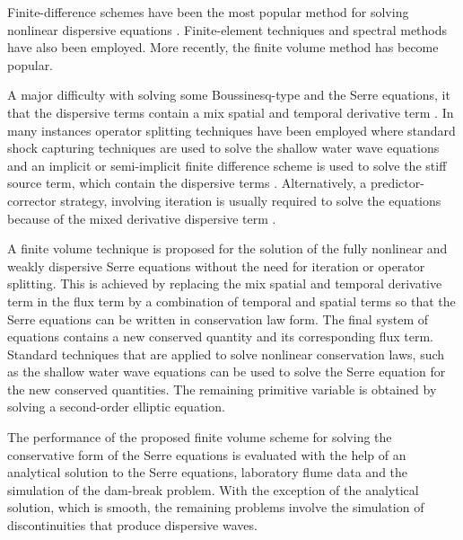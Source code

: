 \documentclass[SingleSpace,12pt]{Serre_ASCE}
\begin{document}
Finite-difference schemes have been the most popular method for solving nonlinear dispersive equations \cite{Antunes-do-Carmo-etal-1993-725,Nwogu-O-1993-618,El-etal-2008-2423,Beji-Nadaoka-1996}. Finite-element techniques \cite{Avilez-Valente-Seabra-Santos-2009-969,Mitsotakis-D-2009-860} and spectral methods \cite{Dias-Milewski-2010,Eskilsson-Sherwin-2002-143} have also been employed. More recently, the finite volume method \cite{Shiach-Mingham-2009-32,Erduran-etal-2005-1213,Erduran-K-2007-827,Soares-Frazao-Guinot-2008-237,Tonelli-Petti-2012-8,Roeber-etal-2010-407,Tonelli-Petti-2009-609} has become popular.

A major difficulty with solving some Boussinesq-type and the Serre equations, it that the dispersive terms  contain a mix spatial and temporal derivative term \cite{Dias-Milewski-2010}. In many instances operator splitting techniques have been employed where standard shock capturing techniques are used to solve the shallow water wave equations and an implicit or semi-implicit finite difference scheme is used to solve the stiff source term, which contain the dispersive terms \cite{Shiach-Mingham-2009-32,Bonneton-etal-2011-589,Erduran-K-2007-827,Soares-Frazao-Guinot-2008-237,Tonelli-Petti-2009-609,Chazel-etal-2011-105}. Alternatively, a predictor-corrector strategy, involving iteration is usually required to solve the equations because of the mixed derivative dispersive term \cite{Beji-Nadaoka-1996,Erduran-K-2007-827,Roeber-etal-2010-407,Shi-etal-2012-36}.

A finite volume technique is proposed for the solution of the fully nonlinear and weakly dispersive Serre equations without the need for iteration or operator splitting. This is achieved by replacing the mix spatial and temporal derivative term in the flux term by a combination of temporal and spatial terms so that the Serre equations can be written in conservation law form. The final system of equations contains a new conserved quantity and its corresponding flux term. Standard techniques that are applied to solve nonlinear conservation laws, such as the shallow water wave equations can be used to solve the Serre equation for the new conserved quantities. The remaining primitive variable is obtained by solving a second-order elliptic equation.

The performance of the proposed finite volume scheme for solving the conservative form of the Serre equations is evaluated with the help of an analytical solution to the Serre equations, laboratory flume data and the simulation of the dam-break problem. With the exception of the analytical solution, which is smooth, the remaining problems involve the simulation of discontinuities that produce dispersive waves.
\end{document}
